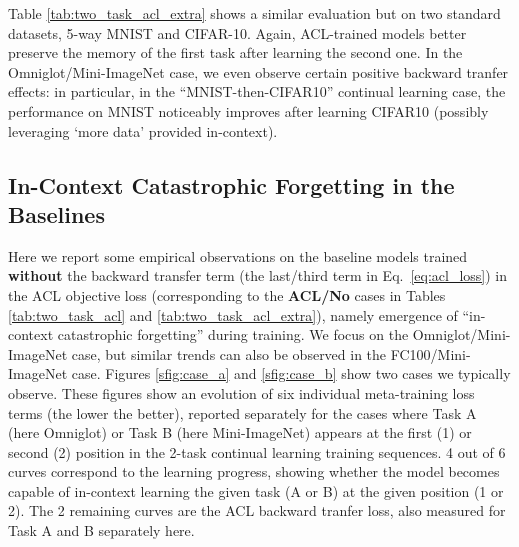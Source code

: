 \documentclass{article}
\begin{document}
Table \ref{tab:two_task_acl_extra} shows a similar evaluation but on two standard datasets, 5-way MNIST and CIFAR-10.
Again, ACL-trained models better preserve the memory of the first task after learning the second one.
In the Omniglot/Mini-ImageNet case,
we even observe certain positive backward tranfer effects: in particular,
in the ``MNIST-then-CIFAR10'' continual learning case, the performance on MNIST noticeably improves after learning CIFAR10 (possibly leveraging `more data' provided in-context).


\subsection{In-Context Catastrophic Forgetting in the Baselines}
\label{sec:analysis}

Here we report some empirical observations on the baseline models trained \textbf{without} the backward transfer term (the last/third term in Eq.~\ref{eq:acl_loss}) in the ACL objective loss (corresponding to the \textbf{ACL/No} cases in Tables \ref{tab:two_task_acl} and \ref{tab:two_task_acl_extra}), namely emergence of ``in-context catastrophic forgetting'' during training.
We focus on the Omniglot/Mini-ImageNet case, but similar trends can also be observed in the FC100/Mini-ImageNet case.
Figures \ref{sfig:case_a} and \ref{sfig:case_b} show two cases we typically observe. 
These figures show an evolution of six individual meta-training loss terms (the lower the better), reported separately for the cases where Task A (here Omniglot) or Task B (here Mini-ImageNet) appears at the first (1) or second (2) position in the 2-task continual learning training sequences.
4 out of 6 curves correspond to the learning progress, showing
whether the model becomes capable of in-context learning the given task (A or B) at the given position (1 or 2).
The 2 remaining curves are the ACL backward tranfer loss, also measured for Task A and B separately here.
\end{document}
